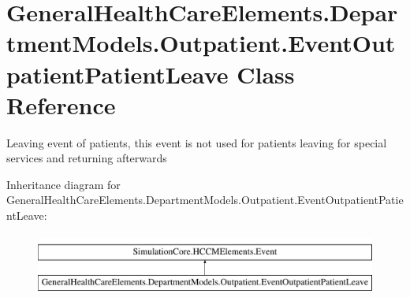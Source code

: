 \hypertarget{class_general_health_care_elements_1_1_department_models_1_1_outpatient_1_1_event_outpatient_patient_leave}{}\section{General\+Health\+Care\+Elements.\+Department\+Models.\+Outpatient.\+Event\+Outpatient\+Patient\+Leave Class Reference}
\label{class_general_health_care_elements_1_1_department_models_1_1_outpatient_1_1_event_outpatient_patient_leave}


Leaving event of patients, this event is not used for patients leaving for special services and returning afterwards  


Inheritance diagram for General\+Health\+Care\+Elements.\+Department\+Models.\+Outpatient.\+Event\+Outpatient\+Patient\+Leave\+:\begin{figure}[H]
\begin{center}
\leavevmode
\includegraphics[height=2.000000cm]{class_general_health_care_elements_1_1_department_models_1_1_outpatient_1_1_event_outpatient_patient_leave}
\end{center}
\end{figure}

